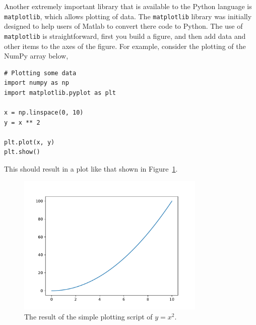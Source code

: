\documentclass[a4paper]{article}
\begin{document}
Another extremely important library that is available to the Python language is \texttt{matplotlib}, which allows plotting of data.
The \texttt{matplotlib} library was initially designed to help users of Matlab to convert there code to Python.
The use of \texttt{matplotlib} is straightforward, first you build a figure, and then add data and other items to the axes of the figure.
For example, consider the plotting of the NumPy array below,
\begin{lstlisting}
# Plotting some data
import numpy as np
import matplotlib.pyplot as plt

x = np.linspace(0, 10)
y = x ** 2

plt.plot(x, y)
plt.show()
\end{lstlisting}
This should result in a plot like that shown in Figure~\ref{fig:x2}.
%
\begin{figure}[t]
\centering
\includegraphics[width=0.8\textwidth]{x_squared}
\caption{\label{fig:x2} The result of the simple plotting script of $y = x ^ 2$.}
\end{figure}
%
\end{document}

